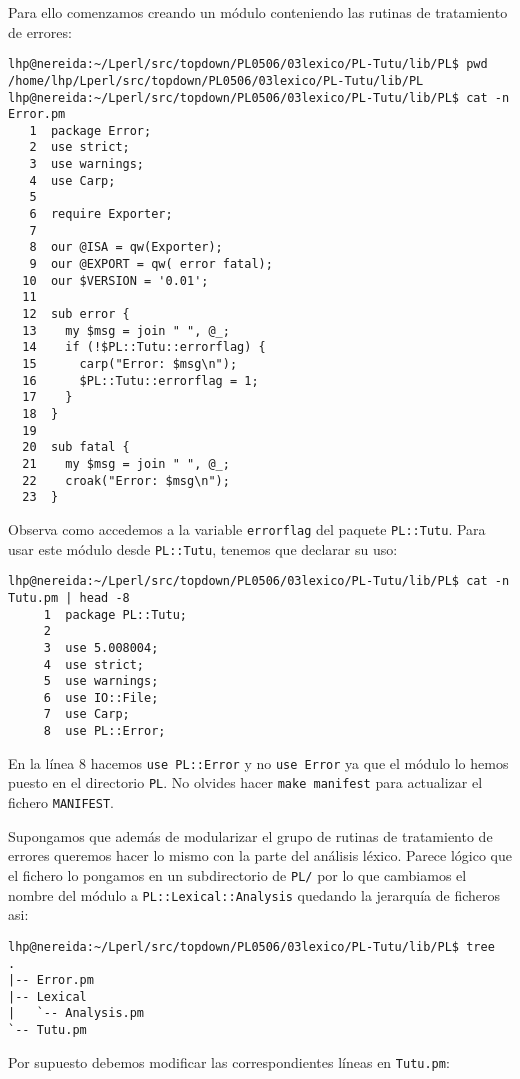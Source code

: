 Para ello comenzamos creando un módulo 
conteniendo las rutinas de tratamiento de errores:
\begin{verbatim}
lhp@nereida:~/Lperl/src/topdown/PL0506/03lexico/PL-Tutu/lib/PL$ pwd
/home/lhp/Lperl/src/topdown/PL0506/03lexico/PL-Tutu/lib/PL
lhp@nereida:~/Lperl/src/topdown/PL0506/03lexico/PL-Tutu/lib/PL$ cat -n Error.pm
   1  package Error;
   2  use strict;
   3  use warnings;
   4  use Carp;
   5
   6  require Exporter;
   7
   8  our @ISA = qw(Exporter);
   9  our @EXPORT = qw( error fatal);
  10  our $VERSION = '0.01';
  11
  12  sub error {
  13    my $msg = join " ", @_;
  14    if (!$PL::Tutu::errorflag) {
  15      carp("Error: $msg\n");
  16      $PL::Tutu::errorflag = 1;
  17    }
  18  }
  19
  20  sub fatal {
  21    my $msg = join " ", @_;
  22    croak("Error: $msg\n");
  23  }
\end{verbatim}
Observa como accedemos a la variable \verb|errorflag| del paquete 
\verb|PL::Tutu|.
Para usar este módulo desde \verb|PL::Tutu|, tenemos que declarar su uso:
\begin{verbatim}
lhp@nereida:~/Lperl/src/topdown/PL0506/03lexico/PL-Tutu/lib/PL$ cat -n Tutu.pm | head -8
     1  package PL::Tutu;
     2
     3  use 5.008004;
     4  use strict;
     5  use warnings;
     6  use IO::File;
     7  use Carp;
     8  use PL::Error;
\end{verbatim}
En la línea 8 hacemos \verb|use PL::Error| y no \verb|use Error| ya que el módulo
lo hemos puesto en el directorio \verb|PL|.
No olvides hacer \verb|make manifest| para actualizar el fichero \verb|MANIFEST|.


Supongamos que además de modularizar el grupo de rutinas de tratamiento de errores
queremos hacer lo mismo con la parte del análisis léxico. Parece lógico que el 
fichero lo pongamos en un subdirectorio de \verb|PL/| por lo que cambiamos 
el nombre del módulo a \verb|PL::Lexical::Analysis| quedando la jerarquía de ficheros
asi:
\begin{verbatim}
lhp@nereida:~/Lperl/src/topdown/PL0506/03lexico/PL-Tutu/lib/PL$ tree
.
|-- Error.pm
|-- Lexical
|   `-- Analysis.pm
`-- Tutu.pm
\end{verbatim}

Por supuesto debemos modificar las correspondientes líneas en \verb|Tutu.pm|:

